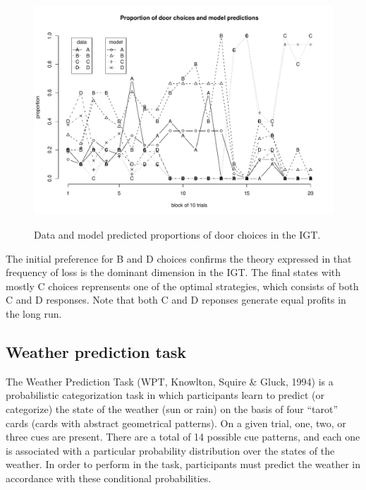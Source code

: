 \documentclass[a4paper,12pt,man]{apa} %
\newcommand{\citet}{\citeA}
\begin{document}
\begin{figure}
\begin{center}
	\includegraphics[width=\textwidth]{graphs/igt4.pdf}
	\label{fig:igt4}
	\caption{Data and model predicted proportions of door choices in
	the IGT.}
\end{center}
\end{figure}

The initial preference for B and D choices confirms the theory
expressed in \citet{Huizenga2007} that frequency of loss is the
dominant dimension in the IGT. The final states with mostly C 
choices reprensents one of the optimal strategies, which consists of
both C and D responses. Note that both C and D reponses generate equal
profits in the long run. 


\subsection{Weather prediction task}


The Weather Prediction Task (WPT, Knowlton, Squire \& Gluck, 1994) is
a probabilistic categorization task in which participants learn to
predict (or categorize) the state of the weather (sun or rain) on the
basis of four ``tarot'' cards (cards with abstract geometrical
patterns).  On a given trial, one, two, or three cues are present.
There are a total of 14 possible cue patterns, and each one is
associated with a particular probability distribution over the states
of the weather.  In order to perform in the task, participants must
predict the weather in accordance with these conditional
probabilities.
\end{document}
